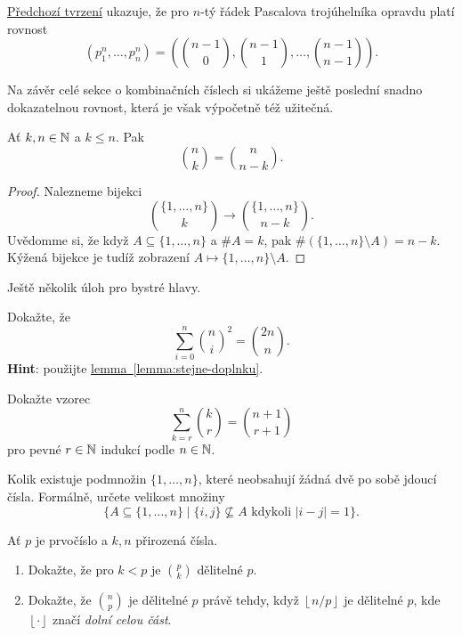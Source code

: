 \hyperref[claim:pascalova-rovnost]{Předchozí tvrzení} ukazuje, že pro $n$-tý
řádek Pascalova trojúhelníka oprav\-du platí rovnost
\[
 (p_1^{n},\ldots,p_n^{n}) = \left(
 \binom{n-1}{0},\binom{n-1}{1},\ldots,\binom{n-1}{n-1} \right).
\]

Na závěr celé sekce o kombinačních číslech si ukážeme ještě poslední snadno
dokazatelnou rovnost, která je však výpočetně též užitečná.

\begin{lemma}
 \label{lemma:stejne-doplnku}
 Ať $k,n \in \mathbb{N}$ a $k \leq n$. Pak
 \[
  \binom{n}{k} = \binom{n}{n-k}.
 \]
\end{lemma}
\begin{proof}
 Nalezneme bijekci
 \[
  \binom{\{1,\ldots,n\}}{k} \to \binom{\{1,\ldots,n\}}{n-k}.
 \]
 Uvědomme si, že když $A \subseteq \{1,\ldots,n\}$ a $\# A = k$, pak $\#
 (\{1,\ldots,n\} \setminus A) = n - k$. Kýžená bijekce je tudíž zobrazení $A
 \mapsto \{1,\ldots,n\} \setminus A$.
\end{proof}

Ještě několik úloh pro bystré hlavy.

\begin{exercise}
 Dokažte, že
 \[
  \sum_{i=0}^{n} \binom{n}{i}^2 = \binom{2n}{n}.
 \]
 \textbf{Hint}: použijte
 \hyperref[lemma:stejne-doplnku]{lemma~\ref*{lemma:stejne-doplnku}}.
\end{exercise}

\begin{exercise}
 Dokažte vzorec
 \[
  \sum_{k=r}^{n} \binom{k}{r} = \binom{n+1}{r+1}
 \]
 pro pevné $r \in \mathbb{N}$ indukcí podle $n \in \mathbb{N}$.
\end{exercise}

\begin{exercise}[těžké]
 Kolik existuje podmnožin $\{1,\ldots,n\}$, které neobsahují žádná dvě po sobě
 jdoucí čísla. Formálně, určete velikost množiny
 \[
  \{A \subseteq \{1,\ldots,n\} \mid \{i,j\} \nsubseteq A \text{ kdykoli }
  |i-j|=1\}.
 \]
\end{exercise}

\begin{exercise}
 Ať $p$ je prvočíslo a $k,n$ přirozená čísla.
 \begin{enumerate}[label=(\alph*),topsep=0pt]
  \item Dokažte, že pro $k<p$ je $\binom{p}{k}$ dělitelné $p$.
  \item Dokažte, že $\binom{n}{p}$ je dělitelné $p$ právě tehdy, když $\left\lfloor n
   / p \right\rfloor$ je dělitelné $p$, kde $\left\lfloor  \cdot \right\rfloor$ 
   značí \emph{dolní celou část}.
 \end{enumerate}
\end{exercise}

